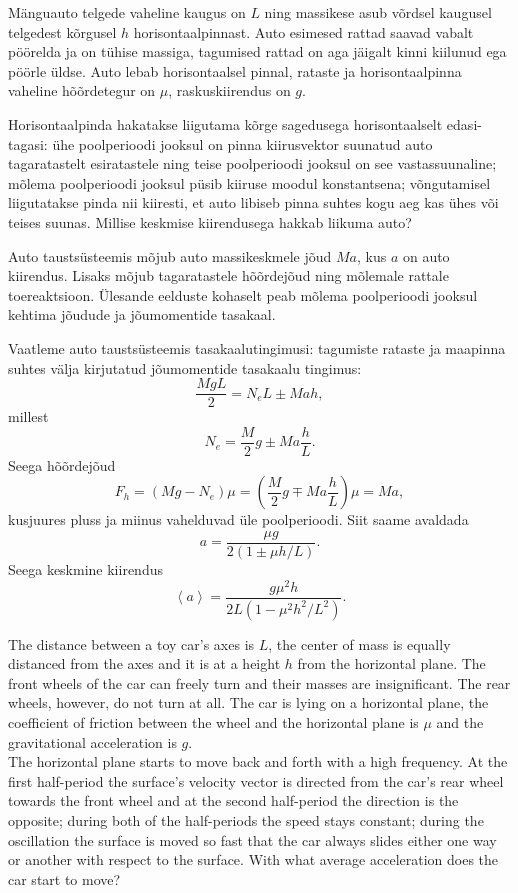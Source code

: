 
Mänguauto telgede vaheline kaugus on $L$ ning massikese asub võrdsel kaugusel telgedest kõrgusel $h$ horisontaalpinnast. Auto esimesed rattad saavad vabalt pöörelda ja on tühise massiga, tagumised rattad on aga jäigalt kinni kiilunud ega pöörle üldse. Auto lebab horisontaalsel pinnal, rataste ja horisontaalpinna vaheline hõõrdetegur on $\mu$, raskuskiirendus on $g$.

Horisontaalpinda hakatakse liigutama kõrge sagedusega horisontaalselt edasi-tagasi: ühe poolperioodi jooksul on pinna kiirusvektor suunatud auto tagaratastelt esiratastele ning teise poolperioodi jooksul on see vastassuunaline; mõlema poolperioodi jooksul püsib kiiruse moodul konstantsena; võngutamisel liigutatakse pinda nii kiiresti, et auto libiseb pinna suhtes kogu aeg kas ühes või teises suunas. Millise keskmise kiirendusega hakkab liikuma auto?

\hint
Auto taustsüsteemis mõjub auto massikeskmele jõud $Ma$, kus $a$ on auto kiirendus. Lisaks mõjub tagaratastele hõõrdejõud ning mõlemale rattale toereaktsioon. Ülesande eelduste kohaselt peab mõlema poolperioodi jooksul kehtima jõudude ja jõumomentide tasakaal.

\solu
Vaatleme auto taustsüsteemis tasakaalutingimusi: tagumiste rataste ja maapinna suhtes välja kirjutatud jõumomentide tasakaalu tingimus:
\[
\frac {MgL}2=N_eL\pm Mah,
\]
millest
\[
N_e=\frac M2g\pm Ma\frac hL.
\]
Seega hõõrdejõud
\[
F_h=(Mg-N_e)\mu=\left(\frac M2g\mp Ma\frac hL\right)\mu=Ma,
\]
kusjuures pluss ja miinus vahelduvad üle poolperioodi. Siit saame avaldada
\[
a=\frac{\mu g}{2(1\pm \mu h/L)}.
\]
Seega keskmine kiirendus
\[
\left< a\right>=\frac{g\mu^2h}{2L(1-\mu^2h^2/L^2)}.
\]

The distance between a toy car’s axes is $L$, the center of mass is equally distanced from the axes and it is at a height $h$ from the horizontal plane. The front wheels of the car can freely turn and their masses are insignificant. The rear wheels, however, do not turn at all. The car is lying on a horizontal plane, the coefficient of friction between the wheel and the horizontal plane is $\mu$ and the gravitational acceleration is $g$.\\
The horizontal plane starts to move back and forth with a high frequency. At the first half-period the surface’s velocity vector is directed from the car’s rear wheel towards the front wheel and at the second half-period the direction is the opposite; during both of the half-periods the speed stays constant; during the oscillation the surface is moved so fast that the car always slides either one way or another with respect to the surface. With what average acceleration does the car start to move?

